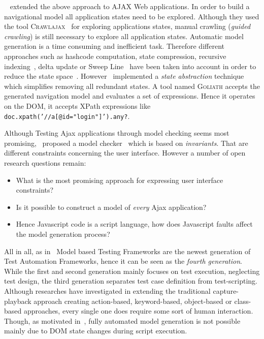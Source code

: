 \documentclass[12pt, notitlepage]{article}
\begin{document}
~\citet{dynamic-testing-web-applications} extended the above approach to AJAX Web applications. In order to build a navigational model all 
application states need to be explored. Although they used the tool \textsc{Crawlajax}~\cite{crawlajax} for exploring applications states, manual
crawling (\textit{guided crawling}) is still necessary to explore all application states. Automatic model generation is a time consuming and inefficient task. 
Therefore different approaches such as hashcode computation, state compression, recursive indexing~\cite{recursive-indexing}, delta update or Sweep
Line~\cite{sweep-line} have been taken into account in order to reduce the state space~\cite{state-space-reduction}. However~\cite{dynamic-testing-web-applications}
implemented a \textit{state abstraction} technique which simplifies removing all redundant states. A tool
named \textsc{Goliath} accepts the generated navigation model and evaluates a set of expressions. Hence it operates on the DOM, it accepts XPath expressions like \texttt{doc.xpath('//a[@id="login"]').any?}. 

Although Testing Ajax applications through model checking seems most promising,~\citet{research-issues-model-checking-ajax} proposed a model checker~\cite{atusa} which is based on \textit{invariants}. That are
different constraints concerning the user interface. However a number of open research questions remain:
\begin{itemize}
	\item What is the most promising approach for expressing user interface constraints?
	\item Is it possible to construct a model of \textit{every} Ajax application?
	\item Hence Javascript code is a script language, how does Javascript faults affect the model generation process?
\end{itemize}
\vspace{1.5cm}
All in all, as in~\cite{why-model-based-automation} Model based Testing Frameworks are the newest generation of Test
Automation Frameworks, hence it can be seen as the \textit{fourth generation}. While the first and second generation mainly focuses on test execution, neglecting test design, the third generation separates test case definition from test-scripting. Although researches have investigated in extending the traditional capture-playback approach creating action-based, keyword-based, object-based or class-based approaches, every single one does require
some sort of human interaction. Though, as motivated in~\cite{crawlajax}, fully automated model generation is not possible mainly
due to DOM state changes during script execution. 
 
\end{document}
